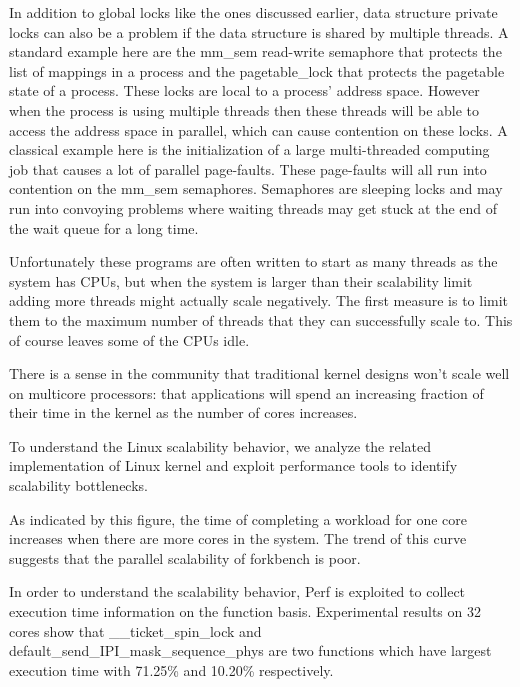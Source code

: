 In addition to global locks like the ones discussed earlier, 
data structure private locks can also be a problem 
if the data structure is shared by multiple threads. 
A standard example here are the mm\_sem read-write semaphore 
that protects the list of mappings in a process and 
the pagetable\_lock that protects the pagetable state of a process. 
These locks are local to a process’ address space. 
However when the process is using multiple threads 
then these threads will be able to access the address space in parallel,
which can cause contention on these locks. 
A classical example here is 
the initialization of a large multi-threaded computing job 
that causes a lot of parallel page-faults. 
These page-faults will all run into contention on the mm\_sem semaphores. Semaphores are sleeping locks 
and may run into convoying problems 
where waiting threads may 
get stuck at the end of the wait queue for a long time.\cite{Andi2009lmulticore}

Unfortunately these programs are often written to start as many threads as the system has CPUs, 
but when the system is larger than their scalability limit adding more threads might actually scale negatively.
The first measure is to limit them to the maximum number of threads that they can successfully scale to.
This of course leaves some of the CPUs idle. 




There is a sense in the community that traditional kernel
designs won’t scale well on multicore processors: that
applications will spend an increasing fraction of their time
in the kernel as the number of cores increases.

To understand the Linux scalability
behavior, we analyze the related implementation of Linux
kernel and exploit performance tools to identify scalability
bottlenecks.


As indicated by this figure, the time of completing
a workload for one core increases when there are more
cores in the system. The trend of this curve suggests that
the parallel scalability of forkbench is poor.

In order to understand the scalability behavior, 
Perf\cite{} is exploited to collect execution time information
on the function basis. 
Experimental results on 32 cores
show that \_\_ticket\_spin\_lock and 
default\_send\_IPI\_mask\_sequence\_phys are two functions 
which have largest execution time with 71.25\% and 10.20\% respectively. 

